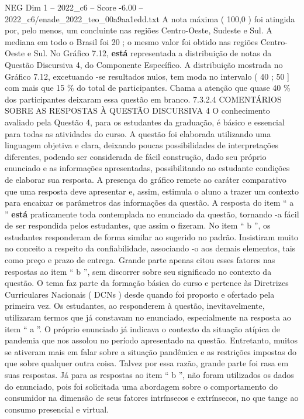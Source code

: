 \begin{textsample}{NEG Dim 1 – 2022\_c6 – Score -6.00 – 2022\_c6/enade\_2022\_teo\_00a9aa1edd.txt}
A nota máxima ( 100,0 ) foi atingida por, pelo menos, um concluinte nas regiões Centro-Oeste, Sudeste e Sul.
A mediana em todo o Brasil foi 20 ; o mesmo valor foi obtido nas regiões Centro-Oeste e Sul.
No Gráfico 7.12, \textbf{está} representada a distribuição de notas da Questão Discursiva 4, do Componente Específico.
A distribuição mostrada no Gráfico 7.12, excetuando -se resultados nulos, tem moda no intervalo ( 40 ; 50 ] com mais que 15 \% do total de participantes.
Chama a atenção que quase 40 \% dos participantes deixaram essa questão em branco. 7.3.2.4 COMENTÁRIOS SOBRE AS RESPOSTAS À QUESTÃO DISCURSIVA 4 O conhecimento avaliado pela Questão 4, para os estudantes da graduação, é básico e essencial para todas as atividades do curso.
A questão foi elaborada utilizando uma linguagem objetiva e clara, deixando poucas possibilidades de interpretações diferentes, podendo ser considerada de fácil construção, dado seu próprio enunciado e as informações apresentadas, possibilitando ao estudante condições de elaborar sua resposta.
A presença do gráfico remete ao caráter comparativo que uma resposta deve apresentar e, assim, estimula o aluno a trazer um contexto para encaixar os parâmetros das informações da questão.
A resposta do item “ a ” \textbf{está} praticamente toda contemplada no enunciado da questão, tornando -a fácil de ser respondida pelos estudantes, que assim o fizeram.
No item “ b ”, os estudantes responderam de forma similar ao sugerido no padrão.
Insistiram muito no conceito a respeito da confiabilidade, associando -o aos demais elementos, tais como preço e prazo de entrega.
Grande parte apenas citou esses fatores nas respostas ao item “ b ”, sem discorrer sobre seu significado no contexto da questão.
O tema faz parte da formação básica do curso e pertence às Diretrizes Curriculares Nacionais ( DCNs ) desde quando foi proposto e ofertado pela primeira vez.
Os estudantes, ao responderem à questão, inevitavelmente, utilizaram termos que já constavam no enunciado, especialmente na resposta ao item “ a ”.
O próprio enunciado já indicava o contexto da situação atípica de pandemia que nos assolou no período apresentado na questão.
Entretanto, muitos se ativeram mais em falar sobre a situação pandêmica e as restrições impostas do que sobre qualquer outra coisa.
Talvez por essa razão, grande parte foi rasa em suas respostas.
Já para as respostas ao item “ b ”, não foram utilizados os dados do enunciado, pois foi solicitada uma abordagem sobre o comportamento do consumidor na dimensão de seus fatores intrínsecos e extrínsecos, no que tange ao consumo presencial e virtual.

\end{textsample}
